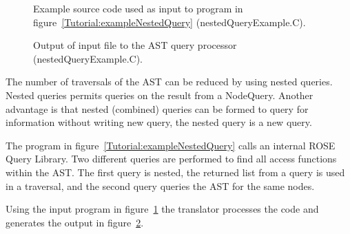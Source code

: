 \begin{figure}[!h]
{\indent
{\mySmallFontSize

\begin{latexonly}
%  
   
\end{latexonly}

\begin{htmlonly}
%  
   
\end{htmlonly}

}
}
\caption{Example source code used as input to program in
    figure~\ref{Tutorial:exampleNestedQuery} (nestedQueryExample.C).}
\label{Tutorial:exampleInputCode_NestedQuery}
\end{figure}

\begin{figure}[!h]
{\indent
{\mySmallFontSize


\begin{latexonly}
   
\end{latexonly}

\begin{htmlonly}
   
\end{htmlonly}

}
}
\caption{Output of input file to the AST query processor (nestedQueryExample.C).}
\label{Tutorial:exampleOutput_NestedQuery}
\end{figure}

The number of traversals of the AST can be reduced by using nested queries. 
Nested queries permits queries on the result from a NodeQuery. Another advantage is 
that nested (combined) queries can be formed to query for information without writing new 
query, the nested query is a new query. 

The program in figure~\ref{Tutorial:exampleNestedQuery} calls 
an internal ROSE Query Library. Two different queries are performed to find all
access functions within the AST. The first query is nested, the 
returned list from a query is used in a traversal, and the second query queries the AST
for the same nodes.

Using the input program in figure~\ref{Tutorial:exampleInputCode_NestedQuery}
the translator processes the code and generates the output in 
figure~\ref{Tutorial:exampleOutput_NestedQuery}.

